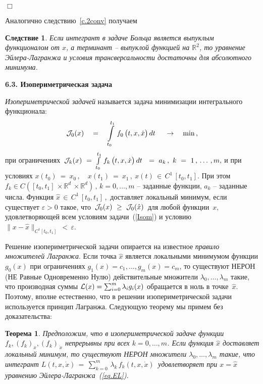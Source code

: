 \documentclass[12pt,a4paper]{article}
\newtheorem{theorem}{Теорема}
\newtheorem{cor}{Следствие}
\newcommand{\re}{{\mathbb R}}
\newcommand{\cJ}{{\cal{J}}}
\newcommand{\cL}{{\cal{L}}}
\begin{document}
{\hfill $\Box$}
\smallskip

Аналогично следствию~\ref{c.2conv} получаем
\begin{cor}\label{c.2conv-boltz}
Если интегрант в задаче Больца является выпуклым функционалом от
$x$, а терминант -- выпуклой функцией на $\re^2$,  то уравнение
Эйлера-Лагранжа и условия трансверсальности достаточны для
абсолютного минимума.
\end{cor}
\medskip

\begin{center}
\textbf{6.3. Изопериметрическая задача}
\end{center}
\bigskip

{\em  Изопериметрической задачей} называется задача минимизации
интегрального функционала:
\begin{equation}\label{Isom}
\cJ_0(x)\quad = \quad \int\limits_{t_0}^{t_1}\, f_0\, \bigl(t, x,
\dot x \bigr)\, d t\ \quad \to \quad \min\, ,
\end{equation}
при ограничениях $\, \cJ_k(x)\ = \ \int\limits_{t_0}^{t_1}\, f_k\,
\bigl(t, x, \dot x \bigr)\, d t\ \ = \ a_k\, , \ k \ = \ 1\, , \,
\ldots \, , m, $ и при условиях  ${x(t_0)\ = \ x_0\, , \quad
x(t_1)\ = \ x_1\, ,
 \ x(t) \, \in \,
C^1\,[t_0, t_1]}$.  При этом $f_k\in C([t_0,
t_1]\, \times \re^d\, \times \re^d)\, , \, k =0, \ldots , m$ -- заданные
функции, $a_k$ -- заданные числа. Функция $\hat x \, \in \, C^1\,
[t_0, t_1]\, , $ доставляет
локальный минимум, если существует $\varepsilon
> 0$ такое, что $\, \cJ_0 (x)\ \ge \ \cJ_0(\hat x)\, $ для любой
 функции~$x$, удовлетворяющей всем условиям задачи~(\ref{Isom}) и условию ${\bigl\| x- \hat x
\bigr\|_{C^1[t_0, t_1]}\, < \, \varepsilon}$.

Решение изопериметрической задачи опирается на известное {\em правило множителей Лагранжа}.
Если точка $\hat x$ является локальными  минимумом функции $g_0(x)$ при ограничениях
$g_1(x) = c_1, \ldots , g_m(x) = c_m$, то существуют НЕРОН (НЕ Равные Одновременно Нулю)
действительные множители $\lambda_0, \ldots , \lambda_m$ такие, что производная суммы
$\cL(x) = \sum_{i=0}^m \lambda_i g_i(x)$ обращается в ноль в точке~$\hat x$.
Поэтому, вполне естественно, что в решении изопериметрической задачи используется принцип Лагранжа.
Следующую теорему мы примем без доказательства:
\begin{theorem}\label{th.isop}
Предположим, что в изопериметрической задаче функции  $f_k,
(f_k)_x, (f_k)_{\, \dot x}$ непрерывны при всех $k = 0, \ldots  ,
m$. Если функция $\hat x$ доставляет  локальный минимум, то
существуют НЕРОН множители $\lambda_0, \ldots , \lambda_m$ такие,
что интегрант $L(t, x , \dot x)\, = \, \sum_{k=0}^m \, \lambda_k\,
f_k(t, x , \dot x)\, $ удовлетворяет при $x = \hat x$  уравнению
Эйлера-Лагранжа~(\ref{eq.EL}).
\end{theorem}
\end{document}
